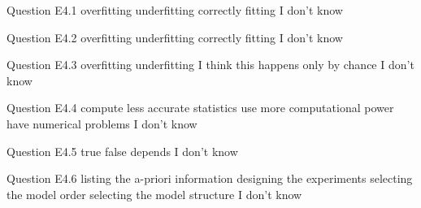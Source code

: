 \begin{frame}{Question E4.1}
	\QuestionNotes{}
	\QuestionAnswers
	{
		\correctanswer overfitting
		\answer underfitting
		\answer correctly fitting
		\answer I don't know
	}
\end{frame}


\begin{frame}{Question E4.2}
	\QuestionNotes{}
	\QuestionAnswers
	{
		\answer overfitting
		\correctanswer underfitting
		\answer correctly fitting
		\answer I don't know
	}
\end{frame}


\begin{frame}{Question E4.3}
	\QuestionNotes{}
	\QuestionAnswers
	{
		\answer overfitting
		\answer underfitting
		\correctanswer I think this happens only by chance
		\answer I don't know
	}
\end{frame}


\begin{frame}{Question E4.4}
	\QuestionNotes{}
	\QuestionAnswers
	{
		\answer compute less accurate statistics
		\correctanswer use more computational power
		\answer have numerical problems
		\answer I don't know
	}
\end{frame}


\begin{frame}{Question E4.5}
	\QuestionNotes{}
	\QuestionAnswers
	{
		\answer true
		\answer false
		\correctanswer depends
		\answer I don't know
	}
\end{frame}


\begin{frame}{Question E4.6}
	\QuestionNotes{}
	\QuestionAnswers
	{
		\correctanswer listing the a-priori information
		\answer designing the experiments
		\answer selecting the model order
		\answer selecting the model structure
		\answer I don't know
	}
\end{frame}


